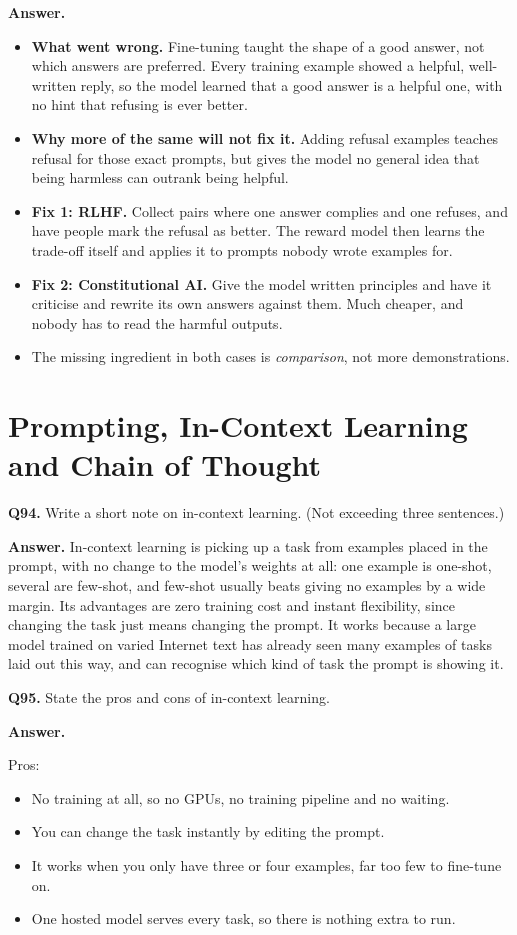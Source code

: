 \documentclass[11pt]{article}
\begin{document}
\textbf{Answer.}
\begin{itemize}
  \item \textbf{What went wrong.} Fine-tuning taught the shape of a good answer, not which answers are preferred. Every training example showed a helpful, well-written reply, so the model learned that a good answer is a helpful one, with no hint that refusing is ever better.
  \item \textbf{Why more of the same will not fix it.} Adding refusal examples teaches refusal for those exact prompts, but gives the model no general idea that being harmless can outrank being helpful.
  \item \textbf{Fix 1: RLHF.} Collect pairs where one answer complies and one refuses, and have people mark the refusal as better. The reward model then learns the trade-off itself and applies it to prompts nobody wrote examples for.
  \item \textbf{Fix 2: Constitutional AI.} Give the model written principles and have it criticise and rewrite its own answers against them. Much cheaper, and nobody has to read the harmful outputs.
  \item The missing ingredient in both cases is \emph{comparison}, not more demonstrations.
\end{itemize}

\section{Prompting, In-Context Learning and Chain of Thought}

\textbf{Q94.} Write a short note on in-context learning. (Not exceeding three sentences.)

\textbf{Answer.} In-context learning is picking up a task from examples placed in the prompt,
with no change to the model's weights at all: one example is one-shot, several are few-shot,
and few-shot usually beats giving no examples by a wide margin. Its advantages are zero
training cost and instant flexibility, since changing the task just means changing the prompt.
It works because a large model trained on varied Internet text has already seen many examples
of tasks laid out this way, and can recognise which kind of task the prompt is showing it.

\medskip
\textbf{Q95.} State the pros and cons of in-context learning.

\textbf{Answer.}

Pros:
\begin{itemize}
  \item No training at all, so no GPUs, no training pipeline and no waiting.
  \item You can change the task instantly by editing the prompt.
  \item It works when you only have three or four examples, far too few to fine-tune on.
  \item One hosted model serves every task, so there is nothing extra to run.
\end{itemize}
\end{document}
